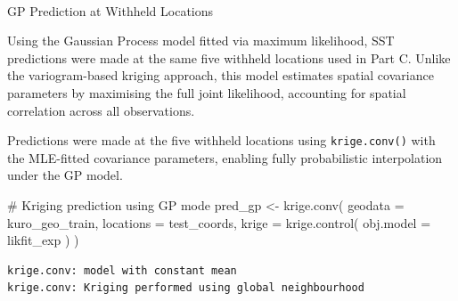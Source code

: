 \documentclass[
  11pt,
]{article}
\makeatletter
\let\oldparagraph\paragraph
\renewcommand{\paragraph}{
    \@ifstar
      \xxxParagraphStar
      \xxxParagraphNoStar
  }
\newcommand{\xxxParagraphStar}[1]{\oldparagraph*{#1}\mbox{}}
\newcommand{\xxxParagraphNoStar}[1]{\oldparagraph{#1}\mbox{}}
\newenvironment{Shaded}{\begin{snugshade}}{\end{snugshade}}
\newcommand{\AttributeTok}[1]{\textcolor[rgb]{0.40,0.45,0.13}{#1}}
\newcommand{\CommentTok}[1]{\textcolor[rgb]{0.37,0.37,0.37}{#1}}
\newcommand{\FunctionTok}[1]{\textcolor[rgb]{0.28,0.35,0.67}{#1}}
\newcommand{\NormalTok}[1]{\textcolor[rgb]{0.00,0.23,0.31}{#1}}
\newcommand{\OtherTok}[1]{\textcolor[rgb]{0.00,0.23,0.31}{#1}}
\newcommand{\SpecialCharTok}[1]{\textcolor[rgb]{0.37,0.37,0.37}{#1}}
\makeatother
\begin{document}
\paragraph{GP Prediction at Withheld
Locations}\label{gp-prediction-at-withheld-locations}

Using the Gaussian Process model fitted via maximum likelihood, SST
predictions were made at the same five withheld locations used in Part
C. Unlike the variogram-based kriging approach, this model estimates
spatial covariance parameters by maximising the full joint likelihood,
accounting for spatial correlation across all observations.

Predictions were made at the five withheld locations using
\texttt{krige.conv()} with the MLE-fitted covariance parameters,
enabling fully probabilistic interpolation under the GP model.

\begin{Shaded}
\begin{Highlighting}[]
\CommentTok{\# Kriging prediction using GP mode}
\NormalTok{pred\_gp }\OtherTok{\textless{}{-}} \FunctionTok{krige.conv}\NormalTok{(}
  \AttributeTok{geodata =}\NormalTok{ kuro\_geo\_train,}
  \AttributeTok{locations =}\NormalTok{ test\_coords,}
  \AttributeTok{krige =} \FunctionTok{krige.control}\NormalTok{(}
    \AttributeTok{obj.model =}\NormalTok{ likfit\_exp}
\NormalTok{  )}
\NormalTok{)}
\end{Highlighting}
\end{Shaded}

\begin{verbatim}
krige.conv: model with constant mean
krige.conv: Kriging performed using global neighbourhood 
\end{verbatim}

\begin{Shaded}
\end{Shaded}
\end{document}
